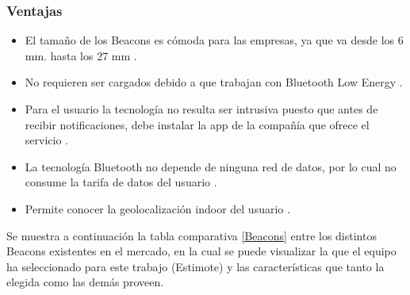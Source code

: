\subsubsection{Ventajas}
\FloatBarrier
\begin{itemize}
\item El tamaño de los Beacons es cómoda para las empresas, ya que va desde los 6 mm. hasta los 27 mm \cite{Ventajas}.
\item No requieren ser cargados debido a que trabajan con Bluetooth Low Energy \cite{Ventajas}.
\item Para el usuario la tecnología no resulta ser intrusiva puesto que antes de recibir notificaciones, debe instalar la app de la compañía que ofrece el servicio \cite{Ventajas}.
\item La tecnología Bluetooth no depende de ninguna red de datos, por lo cual no consume la tarifa de datos del usuario \cite{Ventajas}.
\item Permite conocer la geolocalización indoor del usuario \cite{Ventajas}. 
\end{itemize}


Se muestra a continuación la tabla comparativa \ref{Beacons} entre los distintos Beacons existentes en el mercado, en la cual se puede visualizar la que el equipo ha seleccionado para este trabajo (Estimote) y las características que tanto la elegida como las demás proveen.

